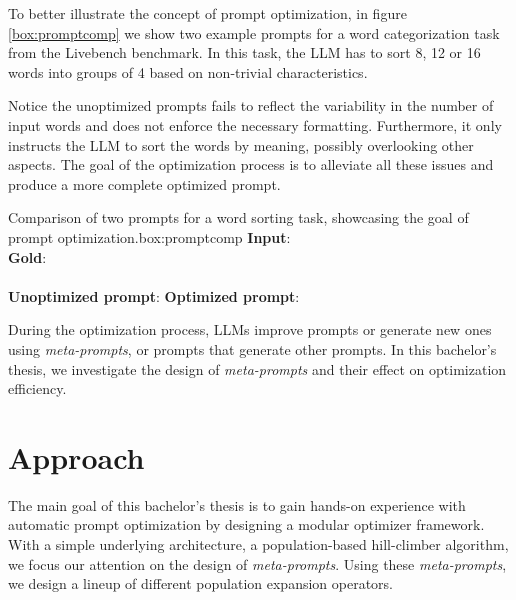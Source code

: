 To better illustrate the concept of prompt optimization, in figure \ref{box:promptcomp} we show two example prompts for a word categorization task from the Livebench\cite{white2025livebenchchallengingcontaminationlimitedllm} benchmark. In this task, the LLM has to sort 8, 12 or 16 words into groups of 4 based on non-trivial characteristics. 

Notice the unoptimized prompts fails to reflect the variability in the number of input words and does not enforce the necessary formatting. Furthermore, it only instructs the LLM to sort the words by meaning, possibly overlooking other aspects. The goal of the optimization process is to alleviate all these issues and produce a more complete optimized prompt.

\begin{figurebox}{Comparison of two prompts for a word sorting task, showcasing the goal of prompt optimization.}{box:promptcomp}
    \textbf{Input}:  \\
    \textbf{Gold}: \,\, \\\\
    \textbf{Unoptimized prompt}:
    \textbf{Optimized prompt}:
\end{figurebox}
\newpage
During the optimization process, LLMs improve prompts or generate new ones using \textit{meta-prompts}, or prompts that generate other prompts. In this bachelor's thesis, we investigate the design of \textit{meta-prompts} and their effect on optimization efficiency.

\section{Approach}
The main goal of this bachelor's thesis is to gain hands-on experience with automatic prompt optimization by designing a modular optimizer framework.
With a simple underlying architecture, a population-based hill-climber algorithm, we focus our attention on the design of \textit{meta-prompts}.
Using these \textit{meta-prompts}, we design a lineup of different population expansion operators. 

